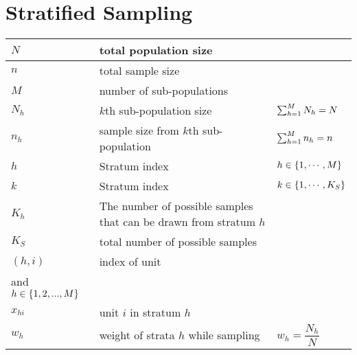 \section{Stratified Sampling \cite{statistics/book/Statistics-for-Data-Scientists/Maurits-Kaptein}}\label{Sampling Plans/Representative Sampling/Stratified Sampling}

\begin{customArrayStretch}{1.3}
\begin{longtable}{>{\centering\arraybackslash}p{1.5cm} p{9cm} p{3.5cm}}

\hline\endfirsthead
\hline\endhead
\hline\endfoot
\hline\endlastfoot

$N$ & total population size & \\ \hline

$n$ & total sample size & \\ \hline

$M$ & number of sub-populations & \\ \hline

$N_h$ & $k$th sub-population size & $\textstyle\sum_{h=1}^{M} N_h = N$ \\ \hline

$n_h$ & sample size from $k$th sub-population & $\textstyle\sum_{h=1}^{M} n_h = n$ \\ \hline

$h$ & Stratum index & $h \in \left\{1, \cdots, M\right\}$ \\ \hline

$k$ & Stratum index & $k \in \left\{1, \cdots, K_S\right\}$ \\ \hline

$K_h$ & The number of possible samples that can be drawn from stratum $h$ \\ \hline

$K_S$ & total number of possible samples \\ \hline

$(h, i)$ & index of unit & \begin{minipage}{3.2cm}
    \vspace{0.1cm}
    $i \in \dCurlyBrac{1, 2,\cdots, N_h }$ \\
    and $h \in \left\{1, 2,..., M\right\}$
    \vspace{0.1cm}
\end{minipage}  \\ \hline

$x_{hi}$ & unit $i$ in stratum $h$ \\ \hline

$w_{h}$ &
    weight of strata $h$ while sampling &
    \begin{minipage}{3.2cm}
        \vspace{0.1cm}
        $w_{h} = \dfrac{N_h}{N}$
        \vspace{0.1cm}
    \end{minipage}
    \\ \hline


\end{longtable}
\end{customArrayStretch}

